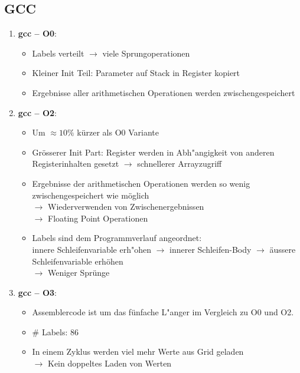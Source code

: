 \documentclass{article}
\begin{document}
\subsection*{GCC}
\begin{enumerate}
	\item{ \textbf{gcc -- O0}:
			\begin{itemize}
				\item Labels verteilt $\rightarrow$ viele Sprungoperationen
				\item Kleiner Init Teil: Parameter auf Stack in Register kopiert
				\item Ergebnisse aller arithmetischen Operationen werden zwischengespeichert
			\end{itemize}
		}
	\item{ \textbf{gcc -- O2}:
			\begin{itemize}
				\item Um $\approx 10\%$ k\"urzer als O0 Variante
				\item Gr\"osserer Init Part: Register werden in Abh"angigkeit
					von anderen Registerinhalten gesetzt $\rightarrow$ schnellerer Arrayzugriff
				\item Ergebnisse der arithmetischen Operationen werden so wenig
					zwischengespeichert wie m\"oglich\\
					$\rightarrow$ Wiederverwenden von Zwischenergebnissen\\
					$\rightarrow$ Floating Point Operationen
				\item Labels sind dem Programmverlauf angeordnet:\\
					innere Schleifenvariable erh"ohen $\rightarrow$ innerer Schleifen-Body $\rightarrow$
					\"aussere Schleifenvariable erh\"ohen\\
					$\longrightarrow$ Weniger Spr\"unge
			\end{itemize}
		}
	\item{ \textbf{gcc -- O3}:
			\begin{itemize}
				\item Assemblercode ist um das f\"unfache L"anger im Vergleich
					zu O0 und O2.
				\item \# Labels: 86
				\item In einem Zyklus werden viel mehr Werte aus Grid geladen\\
					$\rightarrow$ Kein doppeltes Laden von Werten
			\end{itemize}
		}
\end{enumerate}
\end{document}
